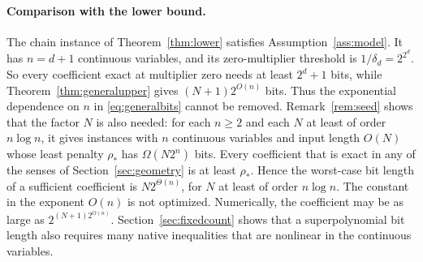 \paragraph{Comparison with the lower bound.}
The chain instance of Theorem~\ref{thm:lower} satisfies
Assumption~\ref{ass:model}. It has $n=d+1$ continuous variables, and its
zero-multiplier threshold is $1/\delta_d=2^{2^d}$. So every coefficient
exact at multiplier zero needs at least $2^d+1$ bits, while
Theorem~\ref{thm:generalupper} gives $(N+1)2^{O(n)}$ bits. Thus the
exponential dependence on $n$ in \eqref{eq:generalbits} cannot be
removed. Remark~\ref{rem:seed} shows that the factor $N$ is also needed:
for each $n\ge2$ and each $N$ at least of order $n\log n$, it gives instances
with $n$ continuous variables and input length $O(N)$ whose least
penalty $\rho_*$ has $\Omega(N2^n)$ bits. Every coefficient that is
exact in any of the senses of Section~\ref{sec:geometry} is at least
$\rho_*$. Hence the worst-case bit length of a sufficient coefficient is
$N2^{\Theta(n)}$, for $N$ at least of order $n\log n$. The
constant in the exponent $O(n)$ is not optimized. Numerically, the
coefficient may be as large as $2^{(N+1)2^{O(n)}}$.
Section~\ref{sec:fixedcount} shows that a superpolynomial bit length
also requires many native inequalities that are nonlinear in the
continuous variables.
